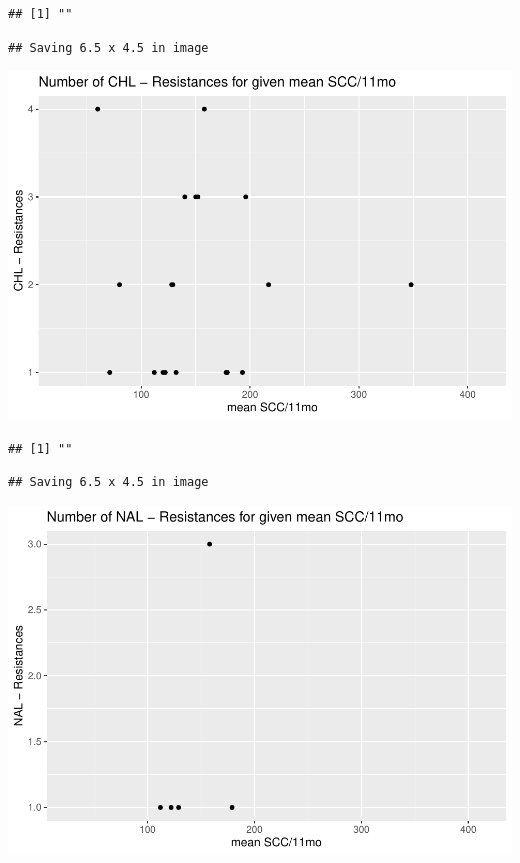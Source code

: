 \documentclass[
]{article}
\begin{document}
\begin{verbatim}
## [1] ""
\end{verbatim}

\begin{verbatim}
## Saving 6.5 x 4.5 in image
\end{verbatim}

\includegraphics{NResistenzen_files/figure-latex/numerical_variables-16.pdf}

\begin{verbatim}
## [1] ""
\end{verbatim}

\begin{verbatim}
## Saving 6.5 x 4.5 in image
\end{verbatim}

\includegraphics{NResistenzen_files/figure-latex/numerical_variables-17.pdf}
\end{document}
